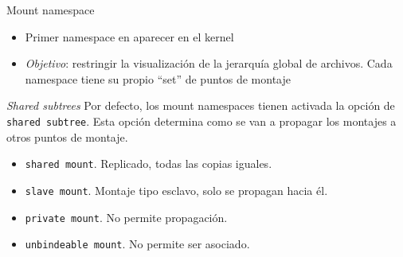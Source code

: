 \documentclass[aspectratio=169,xcolor=dvipsnames]{beamer}
\begin{document}
    \begin{frame}{Mount namespace}
        \begin{itemize}
            \item Primer namespace en aparecer en el kernel
            \item \textit{Objetivo}: restringir la visualización de la jerarquía global de archivos. Cada namespace tiene su propio ``set'' de puntos de montaje
        \end{itemize}
        
        \begin{alertblock}{\textit{Shared subtrees}}
        Por defecto, los mount namespaces tienen activada la opción de \texttt{shared subtree}. Esta opción determina como se van a propagar los montajes a otros puntos de montaje.
        \begin{itemize}
            \item \texttt{shared mount}. Replicado, todas las copias iguales.
            \item \texttt{slave mount}. Montaje tipo esclavo, solo se propagan hacia él.
            \item \texttt{private mount}. No permite propagación.
            \item \texttt{unbindeable mount}. No permite ser asociado.
        \end{itemize}
        \end{alertblock}
    \end{frame}
    
\end{document}
